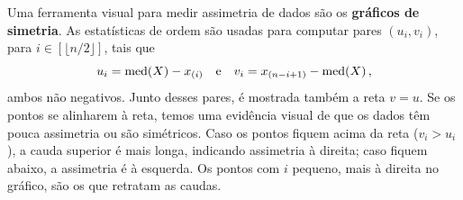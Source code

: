 Uma ferramenta visual para medir assimetria de dados são os \textbf{gráficos de simetria}.
As estatísticas de ordem são usadas para computar pares $(u_i, v_i)$, para
$i \in [\lfloor n/2 \rfloor]$, tais que
\[
    u_i = \mathrm{med}\!\left(X\right) - x_{(i)} \quad \text{e} \quad v_i = x_{(n-i+1)} - \mathrm{med}\!\left(X\right),
\]
ambos não negativos.
Junto desses pares, é mostrada também a reta $v = u$.
Se os pontos se alinharem à reta, temos uma evidência visual de que os dados têm pouca
assimetria ou são simétricos.
Caso os pontos fiquem acima da reta ($v_i > u_i$), a cauda superior é mais longa, indicando
assimetria à direita; caso fiquem abaixo, a assimetria é à esquerda.
Os pontos com $i$ pequeno, mais à direita no gráfico, são os que retratam as caudas.
